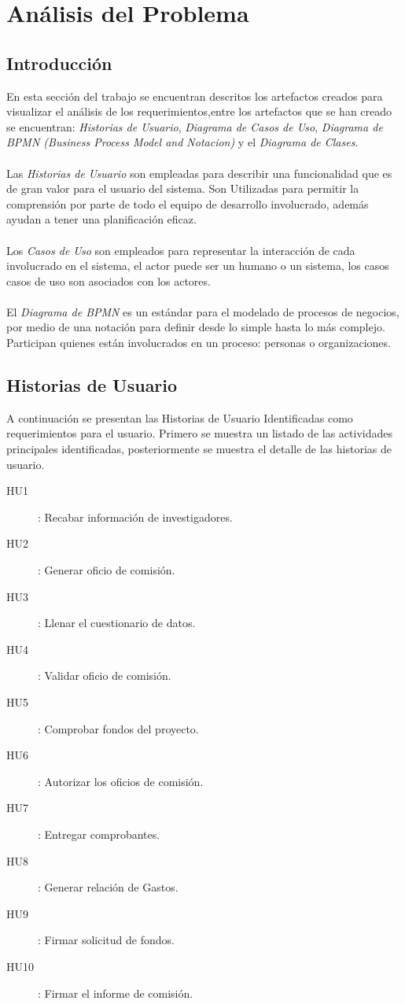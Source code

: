 \documentclass{report}
\begin{document}
\chapter{Análisis del Problema}

    \section{Introducción}
    En esta sección del trabajo se encuentran descritos los artefactos creados para visualizar el análisis de los requerimientos,entre los artefactos que se han creado se encuentran: \emph{Historias de Usuario}, \emph{Diagrama de Casos de Uso}, \emph{Diagrama de BPMN (Business Process Model and Notacion)} y el \emph{Diagrama de Clases}.\\\\
    Las \emph{Historias de Usuario} son empleadas para describir una funcionalidad que es de gran valor para el usuario del sistema. Son Utilizadas para permitir la comprensión por parte de todo el equipo de desarrollo involucrado, además ayudan a tener una planificación eficaz.\\\\
    Los \emph{Casos de Uso} son empleados para representar la  interacción de cada involucrado en el sistema, el actor puede ser un humano o un sistema, los casos casos de uso son asociados con los actores.\\\\
    El \emph{Diagrama de BPMN} es un estándar para el modelado de procesos de negocios, por medio de una notación para definir desde lo simple hasta lo más complejo. Participan quienes están involucrados en un proceso: personas o organizaciones.
    
    \section{Historias de Usuario}
    A continuación se presentan las Historias de Usuario Identificadas como requerimientos para el usuario. Primero se muestra un listado de las actividades principales identificadas, posteriormente se muestra el detalle de las historias de usuario.
    
    \begin{description}
        \item[HU1]: Recabar información de investigadores.
        \item[HU2]: Generar oficio de comisión.
        \item[HU3]: Llenar el cuestionario de datos.
        \item[HU4]: Validar oficio de comisión.
        \item[HU5]: Comprobar fondos del proyecto.
        \item[HU6]: Autorizar los oficios de comisión.
        \item[HU7]: Entregar comprobantes.
        \item[HU8]: Generar relación de Gastos.
        \item[HU9]: Firmar solicitud de fondos.
        \item[HU10]: Firmar el informe de comisión.
    \end{description}
    
\end{document}
